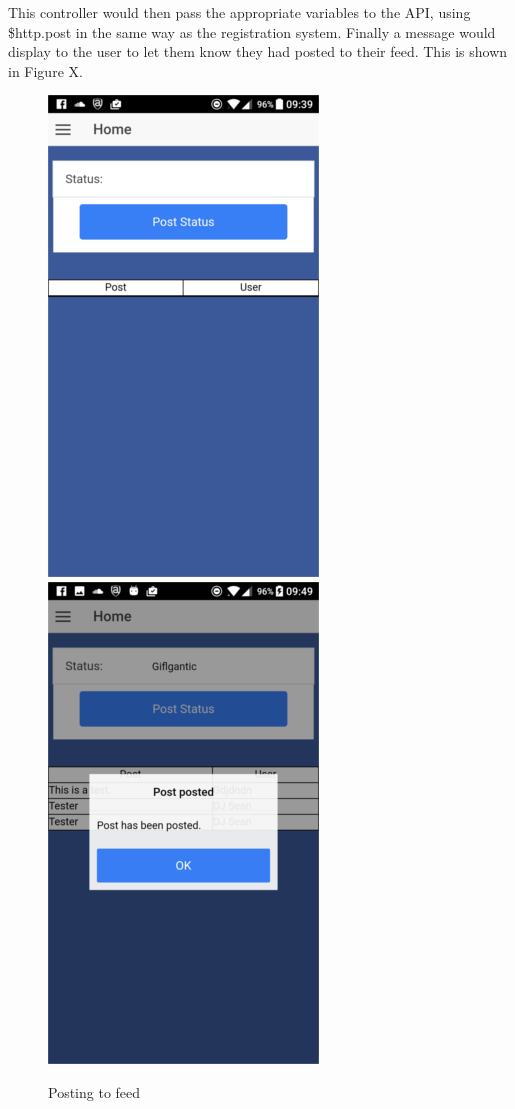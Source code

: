 This controller would then pass the appropriate variables to the API, using \$http.post in the same way as the registration system. Finally a message would display to the user to let them know they had posted to their feed. This is shown in Figure X.
\begin{center}
\begin{figure}[H]
\includegraphics[scale=0.5]{images/sc10}
\includegraphics[scale=0.5]{images/sc11}
\caption{Posting to feed}
\end{figure}
\end{center}

